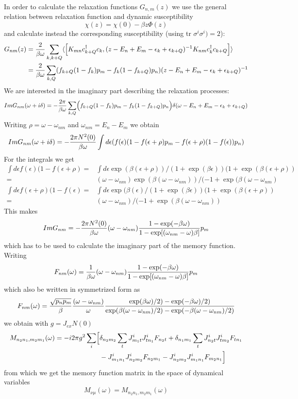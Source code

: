 In order to calculate the relaxation functions $G_{n,m}(z)$
we use the general relation between relaxation function and dynamic
susceptibility
$$
\chi(z)= \chi(0)-\beta z \Phi(z)
$$
and calculate instead the corresponding susceptibility (using tr
$\sigma^i\sigma^i)=2$):
\begin{eqnarray}
G_{nm}(z)&= {2\over \beta \omega}\sum_{k,k+Q} \langle \Bigl[K_{mn}
 c^\dagger_{k+Q}c_{k},(z - E_n +
E_m  -\epsilon_k+\epsilon_{k+Q})^{-1} K_{nm}
c^\dagger_{k}c_{k+Q}\Bigr]\rangle \nonumber\\
&=  {2\over \beta \omega
}\sum_{k,Q}(f_{k+Q}(1-f_{k})p_m-f_{k}(1-f_{k+Q})p_n)(
z-E_n+E_m-\epsilon_{k}+\epsilon_{k+Q})^{-1}\nonumber
\end{eqnarray}
We are interested in the imaginary part describing the relaxation processes:
$$
Im G_{nm}(\omega+i\delta)= - {2\pi \over \beta \omega
}\sum_{k,Q}\Bigl(f_{k+Q}(1-f_{k})p_m-f_{k}(1-f_{k+Q})p_n \Bigr)
 \delta(\omega -E_n+E_m-\epsilon_{k}+\epsilon_{k+Q})
$$
Writing $ \rho=\omega - \omega_{nm}$ and $\omega_{nm}=E_n-E_m$  we obtain
$$
Im G_{nm}(\omega+i\delta)= - {2\pi N^2(0)\over \beta \omega} \int d\epsilon  
 (f(\epsilon)(1-f(\epsilon+\rho) p_m
- f(\epsilon+\rho)(1-f(\epsilon))p_n)
$$
For the integrals we get
\begin{eqnarray}
\int d\epsilon f(\epsilon)(1-f(\epsilon+\rho)=&\int d\epsilon
\exp(\beta(\epsilon+\rho))/
(1+\exp(\beta\epsilon))(1+\exp(\beta(\epsilon+\rho))\nonumber\\
=& 
(\omega-\omega_{nm})\exp(\beta(\omega-\omega_{nm}))/
(-1+\exp(\beta(\omega-\omega_{nm})\nonumber
\end{eqnarray}
\begin{eqnarray}
\int d\epsilon f(\epsilon+\rho )(1-f(\epsilon)=&\int d\epsilon
\exp(\beta(\epsilon)/
(1+\exp(\beta\epsilon))(1+\exp(\beta(\epsilon+\rho))\nonumber\\
=& 
(\omega-\omega_{nm})/
(-1+\exp(\beta(\omega-\omega_{nm}))\nonumber
\end{eqnarray}
This makes
$$
Im G_{nm}=-{2\pi N^2(0)\over \beta \omega}(\omega -\omega_{nm}) {1-\exp(-\beta
\omega)\over
1-\exp[(\omega_{nm}-\omega)\beta]}p_m
$$
which has to be used to calculate the imaginary part of the memory function.
Writing 
$$
F_{nm}(\omega )= {1\over \beta \omega}(\omega -\omega_{nm}) {1-\exp(-\beta
\omega)\over
1-\exp[(\omega_{nm}-\omega)\beta]}p_m
$$
which also be written in symmetrized form as
$$
F_{nm}(\omega )= {\sqrt{p_np_m}\over \beta}{(\omega -\omega_{nm})\over
\omega} {\exp(\beta \omega)/2) - \exp(-\beta \omega)/2)\over
\exp(\beta (\omega-\omega_{nm})/2) - \exp(-\beta (\omega -\omega_{nm})/2)}
$$
we obtain with $g=J_{ex}N(0)$
\begin{eqnarray}
M_{n_2n_1,m_2m_1}(\omega) =- i 2\pi g^2
\sum_i\Bigl[&
\delta_{n_2m_2}\sum_tJ^i_{m_1t}J^i_{tn_1}F_{n_2t}
+ \delta_{n_1m_1}\sum_tJ^i_{
n_2t}J^i_{tm_2}F_{tn_1}\nonumber\\
&-J^i_{m_1n_1}J^i_{n_2m_2}F_{n_2m_1}
-J^i_{n_2m_2}J^i_{m_1n_1}F_{m_2n_1}\Bigr]
\nonumber
\end{eqnarray}
from which we get the memory function matrix in the space of dynamical variables
$$
M_{\nu \mu}(\omega)= M_{n_2n_1,m_2m_1}(\omega)
$$

